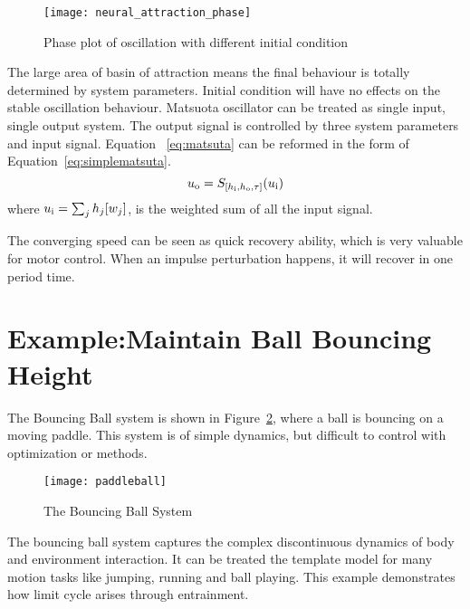 \begin{figure}
\begin{center}
\texttt{[image: neural\_attraction\_phase]}
\end{center}
\caption{Phase plot of oscillation with different initial condition}
\label{fig:phase_attraction}
\end{figure}
 
The large area of basin of attraction means the final behaviour is totally determined by system parameters. 
Initial condition will have no effects on the stable oscillation behaviour. 
Matsuota oscillator can be treated as single input, single output system.
The output signal is controlled by three system parameters and input signal. 
Equation ~\ref{eq:matsuta} can be reformed in the form of Equation~\ref{eq:simplematsuta}.
\begin{equation}
u_{\mathrm{o}}=S_{[h_{\mathrm{i}},h_{\mathrm{o}},\tau]}(u_{\mathrm{i}})
\label{eq:simplematsuta}
\end{equation}
where $u_{\mathrm{i}}=\sum_{j}h_{j}[w_{j}]$, is the weighted sum of all the input signal.

The converging speed can be seen as quick recovery ability, which is very valuable for motor control.
When an impulse perturbation happens, it will recover in one period time.


\section{Example:Maintain Ball Bouncing Height}
\label{sec:qualyexample}
The Bouncing Ball system is shown in Figure~\ref{fig:bball}, where a ball is bouncing on a moving paddle.
This system is of simple dynamics, but difficult to control with optimization or \pd methods.
\begin{figure}
\begin{center}
\texttt{[image: paddleball]}
\end{center}
\caption{The Bouncing Ball System}
\label{fig:bball}
\end{figure}
 
The bouncing ball system captures the complex discontinuous dynamics of body and environment interaction. 
It can be treated the template model for many motion tasks like jumping, running and ball playing.
This example demonstrates how limit cycle arises through entrainment.
 
